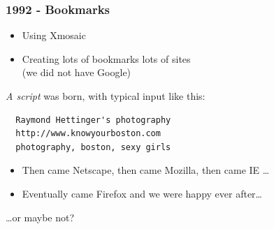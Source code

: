 \documentclass[compress,trans]{beamer}
\begin{document}
\begin{frame}[fragile]
  \frametitle{1992 - Bookmarks}

  \begin{itemize}
    \item Using Xmosaic
    \item Creating lots of bookmarks lots of sites \\
       (we did not have Google)
  \end{itemize}

\pause
\emph{A script} was born, with typical input like this:

\begin{verbatim}
  Raymond Hettinger's photography
  http://www.knowyourboston.com
  photography, boston, sexy girls
\end{verbatim}

  \begin{itemize}
    \item Then came Netscape, \pause then came Mozilla, \pause then came IE \dots
    \pause
    \item Eventually came Firefox and we were happy ever after\dots
  \end{itemize}

  \hfill \dots or maybe not?


\end{frame}
\end{document}
